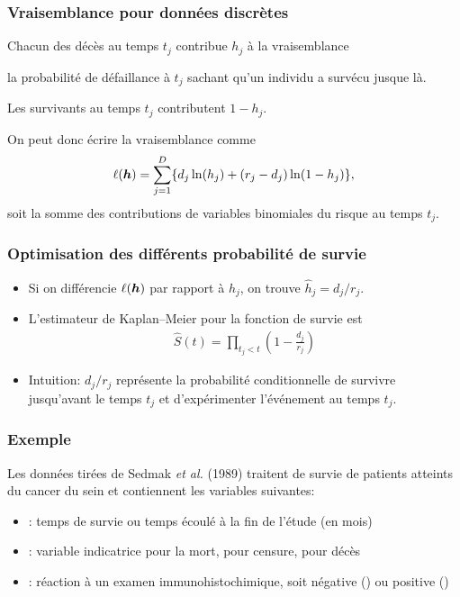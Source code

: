 \documentclass{beamer}
\begin{document}
\begin{frame}
\frametitle{Vraisemblance pour données discrètes}
\bi \item Chacun des décès au temps $t_j$ contribue $h_j$ à la vraisemblance 
\bi \item la probabilité de défaillance à $t_j$ sachant qu'un individu a survécu jusque là. \ei 
\item 
Les survivants au temps $t_j$ contributent $1-h_j$.
\item 
On peut donc écrire la vraisemblance comme
\begin{align*}
 \ell(\boldsymbol {h}) = \sum_{j=1}^D \{ d_j \ln(h_j) + (r_j-d_j)\ln(1-h_j)\},
\end{align*}
soit la somme des contributions de variables binomiales du risque au temps $t_j$.
\ei
\end{frame}
\begin{frame}
\frametitle{Optimisation des différents probabilité de survie}
\begin{itemize}
\item Si on différencie $\ell(\boldsymbol {h})$ par rapport à $h_j$, on trouve $\widehat{h}_j = d_j/r_j$.
\item L'estimateur de Kaplan--Meier pour la fonction de survie est
\begin{align*}
\widehat{S}(t) = \prod_{t_j < t} \left( 1 - \frac{d_j}{r_j} \right)                                                                      \end{align*}
\item 
Intuition: $d_j/r_j$ représente la probabilité conditionnelle de survivre jusqu'avant le temps $t_j$ et d'expérimenter l'événement au temps $t_j$. 
\end{itemize}
\end{frame}

\begin{frame}
\frametitle{Exemple}
 Les données  tirées de Sedmak \textsl{et al.} (1989) traitent de survie de patients atteints du cancer du sein et contiennent les variables suivantes:
\begin{itemize}
 
\item {}: temps de survie ou temps écoulé à la fin de l'étude (en mois)
\item {}: variable indicatrice pour la mort,  pour censure,  pour décès
\item {}: réaction à un examen immunohistochimique, soit négative () ou positive ()
\end{itemize}
%    
% 
\end{frame}
\end{document}
